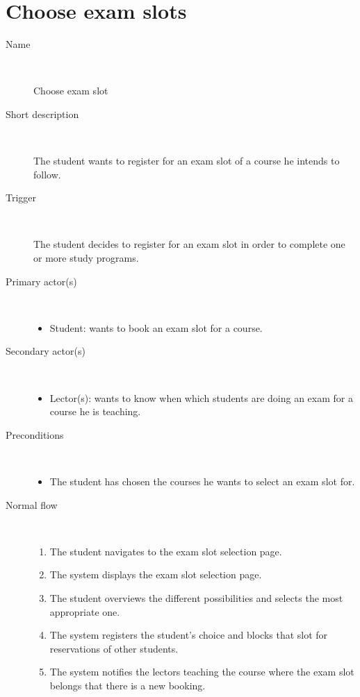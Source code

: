 \section{Choose exam slots}

\begin{description}
	\item[Name] \
		\par Choose exam slot
	\item[Short description] \ 
			\par The student wants to register for an exam slot of a course he intends to
			follow.
	\item[Trigger] \ 
			\par The student decides to register for an exam slot in order to complete
			one or more study programs.
	\item[Primary actor(s)] \ 
		\begin{itemize}
		  \item Student: wants to book an exam slot for a course.
		\end{itemize}
	\item[Secondary actor(s)] \ 
		\begin{itemize}
		  \item Lector(s): wants to know when which students are doing an exam for
		  a course he is teaching.
		\end{itemize}
	\item[Preconditions] \ 
	\begin{itemize}
		\item The student has chosen the courses he wants to select an exam
		slot for.
	\end{itemize}
	\item[Normal flow] \ 
	\begin{enumerate}
	  	\item The student navigates to the exam slot selection page.
	  	\item The system displays the exam slot selection page.
	  	\item The student overviews the different possibilities and selects the most
	  	appropriate one.
	  	\item The system registers the student's choice and blocks that slot for
	  	reservations of other students.
	  	\item The system notifies the lectors teaching the course where the exam
	  	slot belongs that there is a new booking.
	\end{enumerate}

\end{description}

